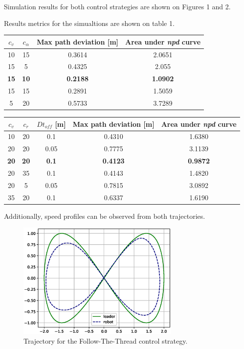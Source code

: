 \documentclass[journal]{IEEEtran}
\begin{document}
Simulation results for both control strategies are shown on Figures 1 and 2.

Results metrics for the simualtions are shown on table 1.


\begin{center}
\begin{tabular}{ |c|c|c|c| }
\hline
$c_v$ & $c_{\alpha}$ & Max path deviation [m] & Area under \textit{npd} curve \\
\hline
10  &   15  & 0.3614 & 2.0651\\
15  &   5  & 0.4325 & 2.055\\
\textbf{15}  &   \textbf{10}  & \textbf{0.2188} & \textbf{1.0902}\\
15  &   15  & 0.2891 & 1.5059\\
5  &   20  & 0.5733 & 3.7289\\
\hline
\end{tabular}
\label{tab:ft_npd_table}
\end{center}


\begin{center}
\begin{tabular}{ |c|c|c|c|c| }
\hline
$c_v$ & $c_r$ & $Dt_{off}$ [m] & Max path deviation [m] & Area under \textit{npd} curve \\
\hline
10  &   20  &   0.1  & 0.4310 & 1.6380\\
20  &   20  &   0.05  & 0.7775 & 3.1139\\
\textbf{20}  &  \textbf{20}  & \textbf{0.1} & \textbf{0.4123} & \textbf{0.9872}\\
20  &   35  &   0.1  & 0.4143 & 1.4820\\
20  &   5  &  0.05  & 0.7815 & 3.0892\\
35  &   20  &   0.1  & 0.6337 & 1.6190\\
\hline
\end{tabular}
\label{tab:ft_npd_table}
\end{center}

Additionally, speed profiles can be observed from both trajectories.

\begin{figure}[h!]
\centering
\includegraphics[width=8cm]{images/ft_a2_n1500_cv15_cr15.eps}
\caption{Trajectory for the Follow-The-Thread control strategy.}
\label{fig:distance_sim}
\end{figure}
\end{document}
